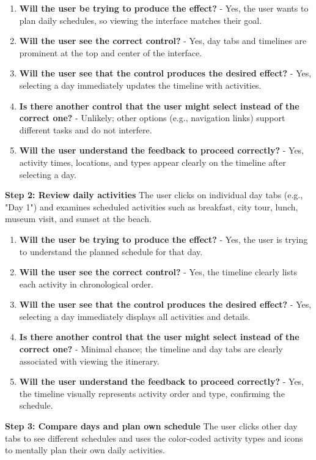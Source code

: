 \documentclass[11pt,a4paper]{article}
\begin{document}
\begin{enumerate}
    \item \textbf{Will the user be trying to produce the effect?} - Yes, the user wants to plan daily schedules, so viewing the interface matches their goal.
    \item \textbf{Will the user see the correct control?} - Yes, day tabs and timelines are prominent at the top and center of the interface.
    \item \textbf{Will the user see that the control produces the desired effect?} - Yes, selecting a day immediately updates the timeline with activities.
    \item \textbf{Is there another control that the user might select instead of the correct one?} - Unlikely; other options (e.g., navigation links) support different tasks and do not interfere.
    \item \textbf{Will the user understand the feedback to proceed correctly?} - Yes, activity times, locations, and types appear clearly on the timeline after selecting a day.
\end{enumerate}

\textbf{Step 2: Review daily activities}  
The user clicks on individual day tabs (e.g., "Day 1") and examines scheduled activities such as breakfast, city tour, lunch, museum visit, and sunset at the beach.  

\begin{enumerate}
    \item \textbf{Will the user be trying to produce the effect?} - Yes, the user is trying to understand the planned schedule for that day.
    \item \textbf{Will the user see the correct control?} - Yes, the timeline clearly lists each activity in chronological order.
    \item \textbf{Will the user see that the control produces the desired effect?} - Yes, selecting a day immediately displays all activities and details.
    \item \textbf{Is there another control that the user might select instead of the correct one?} - Minimal chance; the timeline and day tabs are clearly associated with viewing the itinerary.
    \item \textbf{Will the user understand the feedback to proceed correctly?} - Yes, the timeline visually represents activity order and type, confirming the schedule.
\end{enumerate}

\textbf{Step 3: Compare days and plan own schedule}  
The user clicks other day tabs to see different schedules and uses the color-coded activity types and icons to mentally plan their own daily activities.  
\end{document}
